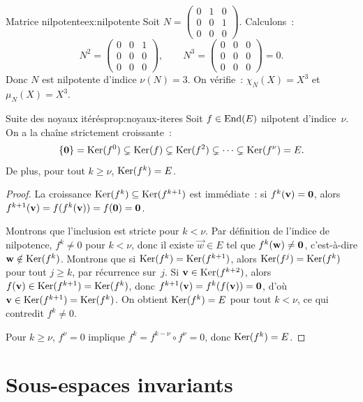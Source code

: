 \begin{example}{Matrice nilpotente}{ex:nilpotente}
  Soit $N=\begin{pmatrix}0&1&0\\0&0&1\\0&0&0\end{pmatrix}$. Calculons~:
  \[
    N^2=\begin{pmatrix}0&0&1\\0&0&0\\0&0&0\end{pmatrix},\qquad
    N^3=\begin{pmatrix}0&0&0\\0&0&0\\0&0&0\end{pmatrix}=0.
  \]
  Donc $N$ est nilpotente d'indice $\nu(N)=3$. On vérifie~:
  $\chi_N(X)=X^3$ et $\mu_N(X)=X^3$.
\end{example}

\begin{proposition}{Suite des noyaux itérés}{prop:noyaux-iteres}
  Soit $f\in\operatorname{End}(E)$ nilpotent d'indice~$\nu$. On a la chaîne
  strictement croissante~:
  \[
    \left\{\mathbf{0}\right\}=\operatorname{Ker}(f^0)\subsetneq\operatorname{Ker}(f)\subsetneq\operatorname{Ker}(f^2)
    \subsetneq\cdots\subsetneq\operatorname{Ker}(f^\nu)=E.
  \]
  De plus, pour tout $k\geq\nu$, $\operatorname{Ker}(f^k)=E$.
\end{proposition}

\begin{proof}
  La croissance $\operatorname{Ker}(f^k)\subseteq\operatorname{Ker}(f^{k+1})$ est immédiate~: si
  $f^k(\mathbf{v})=\mathbf{0}$, alors
  $f^{k+1}(\mathbf{v})=f(f^k(\mathbf{v}))=f(\mathbf{0})=\mathbf{0}$.

  Montrons que l'inclusion est stricte pour $k<\nu$. Par définition de
  l'indice de nilpotence, $f^{k}\neq 0$ pour $k<\nu$, donc il existe
  $\vec{w}\in E$ tel que $f^k(\mathbf{w})\neq\mathbf{0}$, c'est-à-dire
  $\mathbf{w}\notin\operatorname{Ker}(f^k)$. Montrons que si
  $\operatorname{Ker}(f^k)=\operatorname{Ker}(f^{k+1})$, alors $\operatorname{Ker}(f^j)=\operatorname{Ker}(f^k)$ pour tout
  $j\geq k$, par récurrence sur~$j$. Si
  $\mathbf{v}\in\operatorname{Ker}(f^{k+2})$, alors $f(\mathbf{v})\in\operatorname{Ker}(f^{k+1})=\operatorname{Ker}(f^k)$,
  donc $f^{k+1}(\mathbf{v})=f^k(f(\mathbf{v}))=\mathbf{0}$, d'où
  $\mathbf{v}\in\operatorname{Ker}(f^{k+1})=\operatorname{Ker}(f^k)$. On obtient $\operatorname{Ker}(f^k)=E$ pour
  tout $k<\nu$, ce qui contredit $f^k\neq 0$.

  Pour $k\geq\nu$, $f^\nu=0$ implique $f^k=f^{k-\nu}\circ f^\nu=0$,
  donc $\operatorname{Ker}(f^k)=E$.
\end{proof}


\section{Sous-espaces invariants}\label{sec:sous-espaces-invariants}

